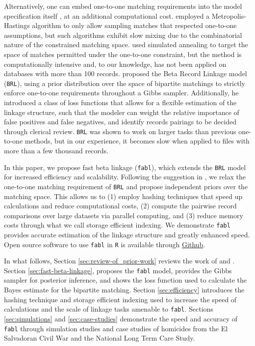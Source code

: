 \documentclass[ba]{imsart}
\begin{document}
Alternatively, one can embed one-to-one matching requirements into the model specification itself \citep{gutman2013bayesian, liseo_2011}, at an additional computational cost. \cite{Larsen05} employed a Metropolis-Hastings algorithm to only allow sampling matches that respected one-to-one assumptions, but such algorithms exhibit slow mixing due to the combinatorial nature of the constrained matching space. \cite{fortunato_2010} used simulated annealing to target the space of matches permitted under the one-to-one constraint, but the method is computationally intensive and, to our knowledge, has not been applied on databases with more than 100 records. \cite{sadinle_bayesian_2017} proposed the Beta Record Linkage model (\texttt{BRL}), using a prior distribution over the space of bipartite matchings to strictly enforce one-to-one requirements throughout a Gibbs sampler. Additionally, he introduced a class of loss functions that allows for a flexible estimation of the linkage structure, such that the modeler can weight the relative importance of false positives and false negatives, and identify records pairings to be decided through clerical review. \texttt{BRL} was shown to work on larger tasks than previous one-to-one methods, but in our experience, it becomes slow when applied to files with more than a few thousand records. 

In this paper, we propose fast beta linkage (\texttt{fabl}), which extends the \texttt{BRL} model for increased efficiency and scalability. Following the suggestion in \cite{wortman2019}, we relax the one-to-one matching requirement of \texttt{BRL} and propose independent priors over the matching space. This allows us to (1) employ hashing techniques that speed up calculations and reduce computational costs, (2) compute the pairwise record comparisons over large datasets via parallel computing, and (3) reduce memory costs through what we call storage efficient indexing. We demonstrate \texttt{fabl} provides accurate estimation of the linkage structure and greatly enhanced speed. Open source software to use \texttt{fabl} in \texttt{R} is available through \href{https://github.com/briankundinger/parlrdev}{Github}.

In what follows, Section \ref{sec:review-of_prior-work} reviews the work of \cite{fellegi_theory_1969} and \cite{sadinle_bayesian_2017}. Section \ref{sec:fast-beta-linkage}, proposes the \texttt{fabl} model, provides the Gibbs sampler for posterior inference, and shows the loss function used to calculate the Bayes estimate for the bipartite matching. Section \ref{sec:efficiency} introduces the hashing technique and storage efficient indexing used to increase the speed of calculations and the scale of linkage tasks amenable to \texttt{fabl}. Sections \ref{sec:simulations} and \ref{sec:case-studies} demonstrate the speed and accuracy of \texttt{fabl} through simulation studies and case studies of homicides from the El Salvadoran Civil War and the National Long Term Care Study.
\end{document}
